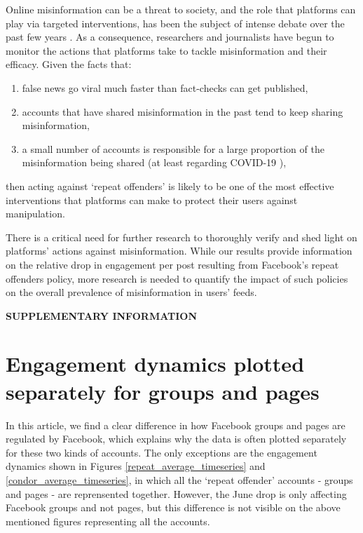 \documentclass[review]{elsarticle}
\newcommand{\beginsupplement}{%
        \setcounter{table}{0}
        \renewcommand{\thetable}{S\arabic{table}}%
        \setcounter{figure}{0}
        \renewcommand{\thefigure}{S\arabic{figure}}%
     }
\begin{document}
{Online misinformation can be a threat to society, and the role that platforms can play via targeted interventions, has been the subject of intense debate over the past few years \citep{rogers2020deplatforming}. 
As a consequence, researchers \citep{mena2020cleaning, yaqub2020effects} and journalists \citep{FacebookPartisanBias, FacebookCivilityGrowth} have begun to monitor the actions that platforms take to tackle misinformation and their efficacy.
Given the facts that:
\begin{enumerate}[(1)]
\item false news go viral much faster than fact-checks can get published,
\item accounts that have shared misinformation in the past tend to keep sharing misinformation,
\item a small number of accounts is responsible for a large proportion of the misinformation being shared (at least regarding COVID-19 \citep{disinformationDozen}),
\end{enumerate}
then acting against `repeat offenders' is likely to be one of the most effective interventions that platforms can make to protect their users against manipulation.

There is a critical need for further research to thoroughly verify and shed light on platforms' actions against misinformation. 
While our results provide information on the relative drop in engagement per post resulting from Facebook’s repeat offenders policy, more research is needed to quantify the impact of such policies on the overall prevalence of misinformation in users’ feeds.



\newpage

\beginsupplement

\textbf{SUPPLEMENTARY INFORMATION}

\section*{Engagement dynamics plotted separately for groups and pages}

In this article, we find a clear difference in how Facebook groups and pages are regulated by Facebook, which explains why the data is often plotted separately for these two kinds of accounts. 
The only exceptions are the engagement dynamics shown in Figures \ref{repeat_average_timeseries} and \ref{condor_average_timeseries}, in which all the `repeat offender' accounts - groups and pages - are reprensented together.
However, the June drop is only affecting Facebook groups and not pages, but this difference is not visible on the above mentioned figures representing all the accounts.

}
\end{document}
